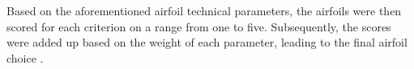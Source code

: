 Based on the aforementioned airfoil technical parameters, the airfoils were then scored for each criterion on a range from one to five.
Subsequently, the scores were added up based on the weight of each parameter, leading to the final airfoil choice
.


\begin{table}[h]
\caption{Airfoil trade-off}
\label{table:airfoil_scores}
\centering
{}
\end{table}

